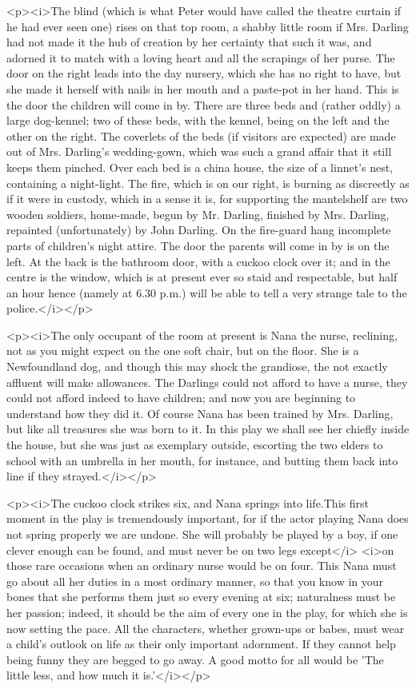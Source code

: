 <p><i>The blind (which is what Peter would have called the theatre
curtain if he had ever seen one) rises on that top room, a shabby
little room if Mrs. Darling had not made it the hub of creation by
her certainty that such it was, and adorned it to match with a loving
heart and all the scrapings of her purse. The door on the right leads
into the day nursery, which she has no right to have, but she made it
herself with nails in her mouth and a paste-pot in her hand. This is
the door the children will come in by. There are three beds and
(rather oddly) a large dog-kennel; two of these beds, with the
kennel, being on the left and the other on the right. The coverlets
of the beds (if visitors are expected) are made out of Mrs. Darling's
wedding-gown, which was such a grand affair that it still keeps them
pinched. Over each bed is a china house, the size of a linnet's nest,
containing a night-light. The fire, which is on our right, is burning
as discreetly as if it were in custody, which in a sense it is, for
supporting the mantelshelf are two wooden soldiers, home-made, begun
by Mr. Darling, finished by Mrs. Darling, repainted (unfortunately)
by John Darling. On the fire-guard hang incomplete parts of
children's night attire. The door the parents will come in by is on
the left. At the back is the bathroom door, with a cuckoo clock over
it; and in the centre is the window, which is at present ever so
staid and respectable, but half an hour hence (namely at 6.30 p.m.)
will be able to tell a very strange tale to the police.</i></p>

<p><i>The only occupant of the room at present is Nana the nurse,
reclining, not as you might expect on the one soft chair, but on the
floor. She is a Newfoundland dog, and though this may shock the
grandiose, the not exactly affluent will make allowances. The
Darlings could not afford to have a nurse, they could not afford
indeed to have children; and now you are beginning to understand how
they did it. Of course Nana has been trained by Mrs. Darling, but
like all treasures she was born to it. In this play we shall see her
chiefly inside the house, but she was just as exemplary outside,
escorting the two elders to school with an umbrella in her mouth, for
instance, and butting them back into line if they strayed.</i></p>

<p><i>The cuckoo clock strikes six, and Nana springs into life.This
first moment in the play is tremendously important, for if the actor
playing Nana does not spring properly we are undone. She will
probably be played by a boy, if one clever enough can be found, and
must never be on two legs except</i> <i>on those rare occasions when
an ordinary nurse would be on four. This Nana must go about all her
duties in a most ordinary manner, so that you know in your bones that
she performs them just so every evening at six; naturalness must be
her passion; indeed, it should be the aim of every one in the play,
for which she is now setting the pace. All the characters, whether
grown-ups or babes, must wear a child's outlook on life as their only
important adornment. If they cannot help being funny they are begged
to go away. A good motto for all would be 'The little less, and how
much it is.'</i></p>

